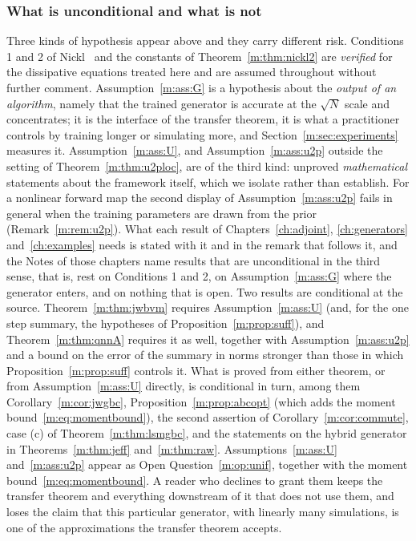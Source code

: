 \subsubsection{What is unconditional and what is not} Three kinds of hypothesis appear above and they carry different risk. Conditions 1 and 2 of Nickl~\cite{nicklbvm2024} and the constants of Theorem~\ref{m:thm:nickl2} are \emph{verified} for the dissipative equations treated here and are assumed throughout without further comment. Assumption~\ref{m:ass:G} is a hypothesis about the \emph{output of an algorithm}, namely that the trained generator is accurate at the $\sqrt N$ scale and concentrates; it is the interface of the transfer theorem, it is what a practitioner controls by training longer or simulating more, and Section~\ref{m:sec:experiments} measures it. Assumption~\ref{m:ass:U}, and Assumption~\ref{m:ass:u2p} outside the setting of Theorem~\ref{m:thm:u2ploc}, are of the third kind: unproved \emph{mathematical} statements about the framework itself, which we isolate rather than establish. For a nonlinear forward map the second display of Assumption~\ref{m:ass:u2p} fails in general when the training parameters are drawn from the prior (Remark~\ref{m:rem:u2p}). What each result of Chapters~\ref{ch:adjoint}, \ref{ch:generators} and~\ref{ch:examples} needs is stated with it and in the remark that follows it, and the Notes of those chapters name results that are unconditional in the third sense, that is, rest on Conditions 1 and 2, on Assumption~\ref{m:ass:G} where the generator enters, and on nothing that is open. Two results are conditional at the source. Theorem~\ref{m:thm:jwbvm} requires Assumption~\ref{m:ass:U} (and, for the one step summary, the hypotheses of Proposition~\ref{m:prop:suff}), and Theorem~\ref{m:thm:qnnA} requires it as well, together with Assumption~\ref{m:ass:u2p} and a bound on the error of the summary in norms stronger than those in which Proposition~\ref{m:prop:suff} controls it. What is proved from either theorem, or from Assumption~\ref{m:ass:U} directly, is conditional in turn, among them Corollary~\ref{m:cor:jwgbc}, Proposition~\ref{m:prop:abcopt} (which adds the moment bound~\eqref{m:eq:momentbound}), the second assertion of Corollary~\ref{m:cor:commute}, case (c) of Theorem~\ref{m:thm:lsmgbc}, and the statements on the hybrid generator in Theorems~\ref{m:thm:jeff} and~\ref{m:thm:raw}. Assumptions~\ref{m:ass:U} and~\ref{m:ass:u2p} appear as Open Question~\ref{m:op:unif}, together with the moment bound~\eqref{m:eq:momentbound}. A reader who declines to grant them keeps the transfer theorem and everything downstream of it that does not use them, and loses the claim that this particular generator, with linearly many simulations, is one of the approximations the transfer theorem accepts.

